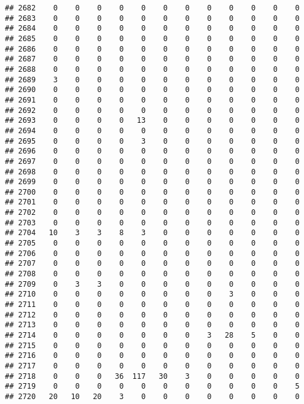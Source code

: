 \documentclass[]{article}
\begin{document}
\begin{verbatim}
## 2682    0    0    0    0    0    0    0    0    0    0    0    0
## 2683    0    0    0    0    0    0    0    0    0    0    0    0
## 2684    0    0    0    0    0    0    0    0    0    0    0    0
## 2685    0    0    0    0    0    0    0    0    0    0    0    0
## 2686    0    0    0    0    0    0    0    0    0    0    0    0
## 2687    0    0    0    0    0    0    0    0    0    0    0    0
## 2688    0    0    0    0    0    0    0    0    0    0    0    0
## 2689    3    0    0    0    0    0    0    0    0    0    0    0
## 2690    0    0    0    0    0    0    0    0    0    0    0    0
## 2691    0    0    0    0    0    0    0    0    0    0    0    0
## 2692    0    0    0    0    0    0    0    0    0    0    0    0
## 2693    0    0    0    0   13    0    0    0    0    0    0    0
## 2694    0    0    0    0    0    0    0    0    0    0    0    0
## 2695    0    0    0    0    3    0    0    0    0    0    0    0
## 2696    0    0    0    0    0    0    0    0    0    0    0    0
## 2697    0    0    0    0    0    0    0    0    0    0    0    0
## 2698    0    0    0    0    0    0    0    0    0    0    0    0
## 2699    0    0    0    0    0    0    0    0    0    0    0    0
## 2700    0    0    0    0    0    0    0    0    0    0    0    0
## 2701    0    0    0    0    0    0    0    0    0    0    0    0
## 2702    0    0    0    0    0    0    0    0    0    0    0    0
## 2703    0    0    0    0    0    0    0    0    0    0    0    0
## 2704   10    3    3    8    3    0    0    0    0    0    0    0
## 2705    0    0    0    0    0    0    0    0    0    0    0    0
## 2706    0    0    0    0    0    0    0    0    0    0    0    0
## 2707    0    0    0    0    0    0    0    0    0    0    0    0
## 2708    0    0    0    0    0    0    0    0    0    0    0    0
## 2709    0    3    3    0    0    0    0    0    0    0    0    0
## 2710    0    0    0    0    0    0    0    0    3    0    0    0
## 2711    0    0    0    0    0    0    0    0    0    0    0    0
## 2712    0    0    0    0    0    0    0    0    0    0    0    0
## 2713    0    0    0    0    0    0    0    0    0    0    0    0
## 2714    0    0    0    0    0    0    0    3   28    5    0    0
## 2715    0    0    0    0    0    0    0    0    0    0    0    0
## 2716    0    0    0    0    0    0    0    0    0    0    0    0
## 2717    0    0    0    0    0    0    0    0    0    0    0    0
## 2718    0    0    0   36  117   30    3    0    0    0    0    0
## 2719    0    0    0    0    0    0    0    0    0    0    0    5
## 2720   20   10   20    3    0    0    0    0    0    0    0    0

\end{verbatim}
\end{document}
